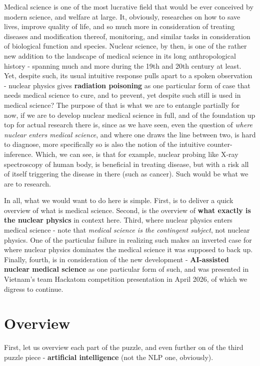 \documentclass[9pt,a4paper]{article}
\begin{document}
Medical science is one of the most lucrative field that would be ever conceived by modern science, and welfare at large. It, obviously, researches on how to save lives, improve quality of life, and so much more in consideration of treating diseases and modification thereof, monitoring, and similar tasks in consideration of biological function and species. Nuclear science, by then, is one of the rather new addition to the landscape of medical science in its long anthropological history - spanning much and more during the 19th and 20th century at least. Yet, despite such, its usual intuitive response pulls apart to a spoken observation - nuclear physics gives \textbf{radiation poisoning} as one particular form of case that needs medical science to cure, and to prevent, yet despite such still is used in medical science? The purpose of that is what we are to entangle partially for now, if we are to develop nuclear medical science in full, and of the foundation up top for actual research there is, since as we have seen, even the question of \textit{where nuclear enters medical science}, and where one draws the line between two, is hard to diagnose, more specifically so is also the notion of the intuitive counter-inference. Which, we can see, is that for example, nuclear probing like X-ray spectroscopy of human body, is beneficial in treating disease, but with a risk all of itself triggering the disease in there (such as cancer). Such would be what we are to research. 

In all, what we would want to do here is simple. First, is to deliver a quick overview of what is medical science. Second, is the overview of \textbf{what exactly is the nuclear physics} in context here. Third, where nuclear physics enters medical science - note that \textit{medical science is the contingent subject}, not nuclear physics. One of the particular failure in realizing such makes an inverted case for where nuclear physics dominates the medical science it was supposed to back up. Finally, fourth, is in consideration of the new development - \textbf{AI-assisted nuclear medical science} as one particular form of such, and was presented in Vietnam's team Hackatom competition presentation in April 2026, of which we digress to continue. 

\section{Overview}

First, let us overview each part of the puzzle, and even further on of the third puzzle piece - \textbf{artificial intelligence} (not the NLP one, obviously). 
\end{document}
